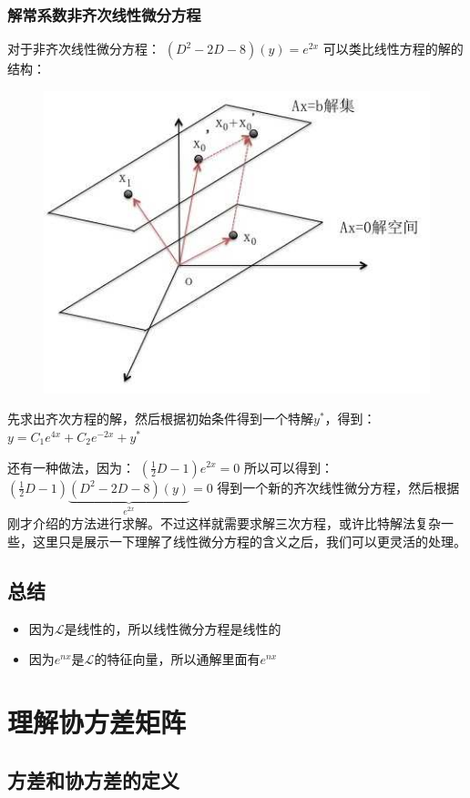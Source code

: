 \documentclass[12pt]{article}
\begin{document}
\subsubsection{解常系数非齐次线性微分方程}
对于非齐次线性微分方程：
$(D^2-2D-8)(y)=e^{2x}$
可以类比线性方程的解的结构：
\begin{figure}[H]
    \centering
    \includegraphics[width=.5\textwidth]{fig/UnderstandLinearDifferentialEquation_2.jpeg}
\end{figure} 

先求出齐次方程的解，然后根据初始条件得到一个特解$y^*$，得到：
$y=C_1e^{4x}+C_2e^{-2x}+y^*$

还有一种做法，因为：
$(\frac{1}{2}D-1)e^{2x}=0$
所以可以得到：
$(\frac{1}{2}D-1)\underbrace{(D^2-2D-8)(y)}_{e^{2x}}=0$
得到一个新的齐次线性微分方程，然后根据刚才介绍的方法进行求解。不过这样就需要求解三次方程，或许比特解法复杂一些，这里只是展示一下理解了线性微分方程的含义之后，我们可以更灵活的处理。

\subsection{总结}
\begin{itemize}
    \item 因为$\mathcal{L}$是线性的，所以线性微分方程是线性的
    \item 因为$e^{nx}$是$\mathcal{L}$的特征向量，所以通解里面有$e^{nx}$
\end{itemize}

\section{理解协方差矩阵\cite{Understand_Covariance_Matrix}}

\subsection{方差和协方差的定义}
\end{document}
